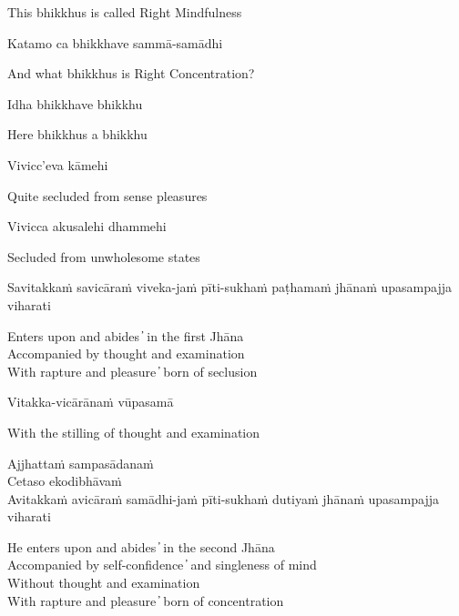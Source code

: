 \begin{cprenglish}
This bhikkhus is called Right Mindfulness
\end{cprenglish}

Katamo ca bhikkhave sammā-samādhi

\begin{cprenglish}
And what bhikkhus is Right Concentration?
\end{cprenglish}

Idha bhikkhave bhikkhu

\begin{cprenglish}
Here bhikkhus a bhikkhu
\end{cprenglish}

Vivicc’eva kāmehi

\begin{cprenglish}
Quite secluded from sense pleasures
\end{cprenglish}

Vivicca akusalehi dhammehi

\begin{cprenglish}
Secluded from unwholesome states
\end{cprenglish}

Savitakkaṁ savicāraṁ viveka-jaṁ pīti-sukhaṁ paṭhamaṁ jhānaṁ upasampajja viharati

\begin{cprenglish}
Enters upon and abides  ̓  in the first Jhāna\\
Accompanied by thought and examination\\
With rapture and pleasure  ̓  born of seclusion
\end{cprenglish}

Vitakka-vicārānaṁ vūpasamā

\begin{cprenglish}
With the stilling of thought and examination
\end{cprenglish}

Ajjhattaṁ sampasādanaṁ\\
Cetaso ekodibhāvaṁ\\
Avitakkaṁ avicāraṁ samādhi-jaṁ pīti-sukhaṁ dutiyaṁ jhānaṁ upasampajja viharati

\begin{cprenglish}
He enters upon and abides  ̓  in the second Jhāna\\
Accompanied by self-confidence  ̓  and singleness of mind\\
Without thought and examination\\
With rapture and pleasure  ̓  born of concentration
\end{cprenglish}

